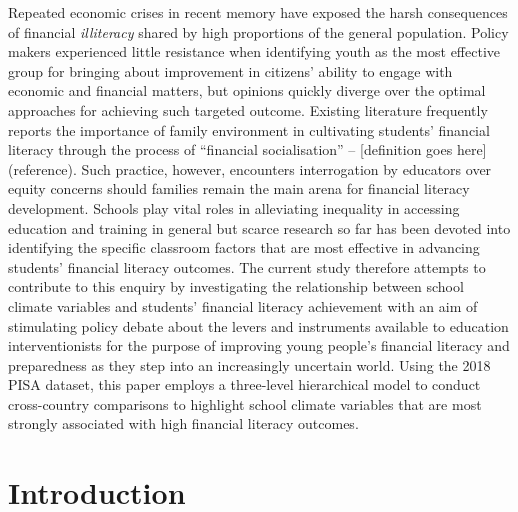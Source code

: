 \documentclass[a4paper,11pt,UKenglish,twoside,openright]{report}\usepackage[]{graphicx}\usepackage[]{color}
\begin{document}
Repeated economic crises in recent memory have exposed the harsh consequences of financial \emph{illiteracy} shared by high proportions of the general population. Policy makers experienced little resistance when identifying youth as the most effective group for bringing about improvement in citizens' ability to engage with economic and financial matters, but opinions quickly diverge over the optimal approaches for achieving such targeted outcome. Existing literature frequently reports the importance of family environment in cultivating students' financial literacy through the process of ``financial socialisation'' -- [definition goes here] (reference). Such practice, however, encounters interrogation by educators over equity concerns should families remain the main arena for financial literacy development. Schools play vital roles in alleviating inequality in accessing education and training in general but scarce research so far has been devoted into identifying the specific classroom factors that are most effective in advancing students' financial literacy outcomes. The current study therefore attempts to contribute to this enquiry by investigating the relationship between school climate variables and students' financial literacy achievement with an aim of stimulating policy debate about the levers and instruments available to education interventionists for the purpose of improving young people's financial literacy and preparedness as they step into an increasingly uncertain world. Using the 2018 PISA dataset, this paper employs a three-level hierarchical model to conduct cross-country comparisons to highlight school climate variables that are most strongly associated with high financial literacy outcomes.

\clearpage
\thispagestyle{empty}

\setcounter{page}{0} %


\chapter{Introduction}
\label{chp:1}


\end{document}
